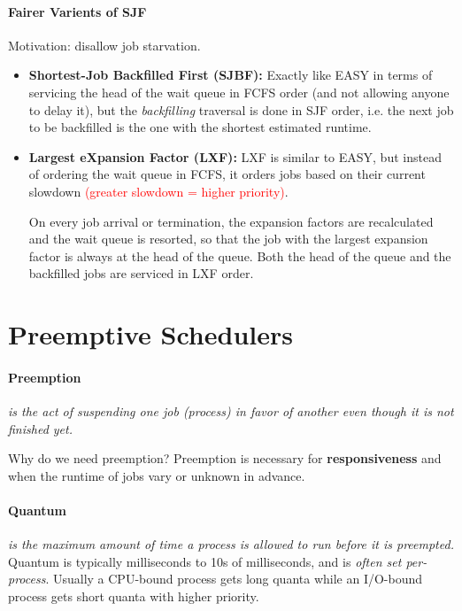 \documentclass[openany,12pt]{book}
\newcommand{\red}[1]{\textcolor{Red}{#1}}
\begin{document}
\paragraph{Fairer Varients of SJF} Motivation: disallow job starvation.
\begin{itemize}
    \item \textbf{Shortest-Job Backfilled First (SJBF):} Exactly like EASY in terms of servicing the head of the wait queue in FCFS order (and not allowing anyone to delay it), but the \textit{backfilling} traversal is done in SJF order, i.e. the next job to be backfilled is the one with the shortest estimated runtime.

    \item \textbf{Largest eXpansion Factor (LXF):} LXF is similar to EASY, but instead of ordering the wait queue in FCFS, it orders jobs based on their current slowdown \red{(greater slowdown = higher priority)}.

          \indent On every job arrival or termination, the expansion factors are recalculated and the wait queue is resorted, so that the job with the largest expansion factor is always at the head of the queue. Both the head of the queue and the backfilled jobs are serviced in LXF order.
\end{itemize}



\newpage
\section*{Preemptive Schedulers}
\paragraph{Preemption} \textit{is the act of suspending one job (process) in favor of another even though it is not finished yet.}

Why do we need preemption? Preemption is necessary for \textbf{responsiveness} and when the runtime of jobs vary or unknown in advance.

\paragraph{Quantum} \textit{is the maximum amount of time a process is allowed to run before it is preempted.} Quantum is typically milliseconds to 10s of milliseconds, and is \textit{often set per-process}. Usually a CPU-bound process gets long quanta while an I/O-bound process gets short quanta with higher priority.
\end{document}
